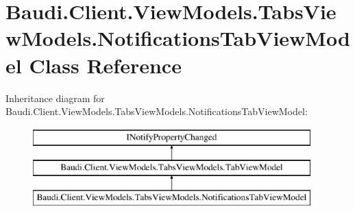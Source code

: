 \hypertarget{class_baudi_1_1_client_1_1_view_models_1_1_tabs_view_models_1_1_notifications_tab_view_model}{}\section{Baudi.\+Client.\+View\+Models.\+Tabs\+View\+Models.\+Notifications\+Tab\+View\+Model Class Reference}
\label{class_baudi_1_1_client_1_1_view_models_1_1_tabs_view_models_1_1_notifications_tab_view_model}
Inheritance diagram for Baudi.\+Client.\+View\+Models.\+Tabs\+View\+Models.\+Notifications\+Tab\+View\+Model\+:\begin{figure}[H]
\begin{center}
\leavevmode
\includegraphics[height=3.000000cm]{class_baudi_1_1_client_1_1_view_models_1_1_tabs_view_models_1_1_notifications_tab_view_model}
\end{center}
\end{figure}
